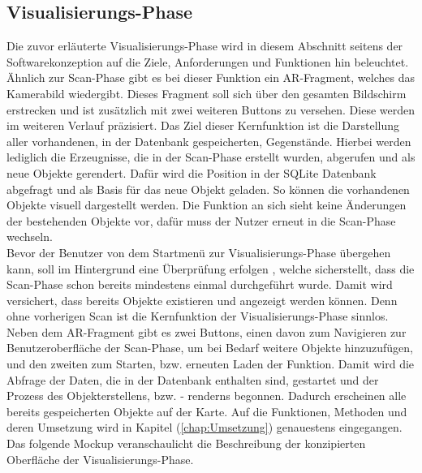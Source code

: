\subsection*{Visualisierungs-Phase}
Die zuvor erläuterte Visualisierungs-Phase wird in diesem Abschnitt seitens der Softwarekonzeption auf die Ziele, Anforderungen und 
Funktionen hin beleuchtet.
\\ 
Ähnlich zur Scan-Phase gibt es bei dieser Funktion ein \acs{AR}-Fragment, welches das Kamerabild wiedergibt. Dieses Fragment soll sich 
über den gesamten Bildschirm erstrecken und ist zusätzlich mit zwei weiteren Buttons zu versehen. Diese werden im weiteren Verlauf 
präzisiert. Das Ziel dieser Kernfunktion ist die Darstellung aller vorhandenen, in der Datenbank gespeicherten, Gegenstände. Hierbei werden 
lediglich die Erzeugnisse, die in der Scan-Phase erstellt wurden, abgerufen und als neue Objekte gerendert. Dafür wird die Position in der 
SQLite Datenbank abgefragt und als Basis für das neue Objekt geladen. So können die vorhandenen Objekte visuell dargestellt werden. Die 
Funktion an sich sieht keine Änderungen der bestehenden Objekte vor, dafür muss der Nutzer erneut in die Scan-Phase wechseln.
\\ 
Bevor der Benutzer von dem Startmenü zur Visualisierungs-Phase übergehen kann, soll im Hintergrund eine Überprüfung erfolgen
, welche sicherstellt, dass 
die Scan-Phase schon bereits mindestens einmal durchgeführt wurde. Damit wird versichert, dass bereits Objekte existieren und angezeigt 
werden können. Denn ohne vorherigen Scan ist die Kernfunktion der Visualisierungs-Phase sinnlos.
\\
Neben dem \acs{AR}-Fragment gibt es zwei Buttons, einen davon zum Navigieren zur Benutzeroberfläche der Scan-Phase, um bei Bedarf weitere Objekte 
hinzuzufügen, und den zweiten zum Starten, bzw. erneuten Laden der Funktion. Damit wird die Abfrage der Daten, die in der Datenbank 
enthalten sind, gestartet und der Prozess des Objekterstellens, bzw. - renderns begonnen. Dadurch erscheinen alle bereits gespeicherten 
Objekte auf der Karte. Auf die Funktionen, Methoden und deren Umsetzung wird in Kapitel (\ref{chap:Umsetzung}) genauestens eingegangen.
Das folgende Mockup veranschaulicht die Beschreibung der konzipierten Oberfläche der Visualisierungs-Phase.
